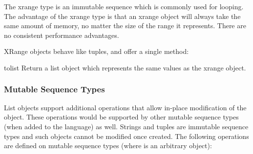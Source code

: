 The xrange type is an immutable sequence which is
commonly used for looping.  The advantage of the xrange type is that an
xrange object will always take the same amount of memory, no matter the
size of the range it represents.  There are no consistent performance
advantages.

XRange objects behave like tuples, and offer a single method:

\begin{methoddesc}[xrange]{tolist}{}
  Return a list object which represents the same values as the xrange
  object.
\end{methoddesc}


\subsubsection{Mutable Sequence Types \label{typesseq-mutable}}

List objects support additional operations that allow in-place
modification of the object.
These operations would be supported by other mutable sequence types
(when added to the language) as well.
Strings and tuples are immutable sequence types and such objects cannot
be modified once created.
The following operations are defined on mutable sequence types (where
 is an arbitrary object):

